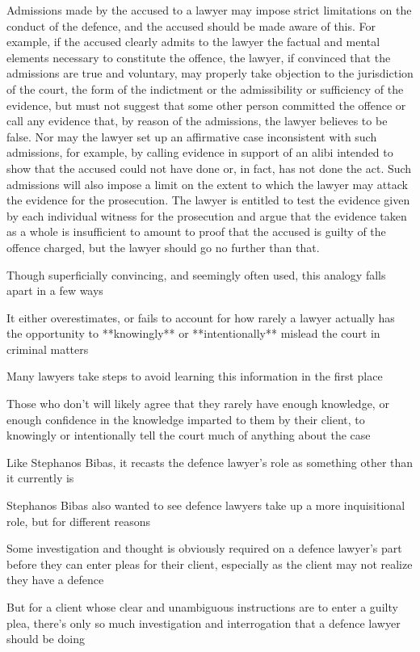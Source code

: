 Admissions made by the accused to a lawyer may impose strict limitations on the conduct of the defence, and the accused should be made aware of this. For example, if the accused clearly admits to the lawyer the factual and mental elements necessary to constitute the offence, the lawyer, if convinced that the admissions are true and voluntary, may properly take objection to the jurisdiction of the court, the form of the indictment or the admissibility or sufficiency of the evidence, but must not suggest that some other person committed the offence or call any evidence that, by reason of the admissions, the lawyer believes to be false. Nor may the lawyer set up an affirmative case inconsistent with such admissions, for example, by calling evidence in support of an alibi intended to show that the accused could not have done or, in fact, has not done the act. Such admissions will also impose a limit on the extent to which the lawyer may attack the evidence for the prosecution. The lawyer is entitled to test the evidence given by each individual witness for the prosecution and argue that the evidence taken as a whole is insufficient to amount to proof that the accused is guilty of the offence charged, but the lawyer should go no further than that.

Though superficially convincing, and seemingly often used, this analogy falls apart in a few ways

It either overestimates, or fails to account for how rarely a lawyer actually has the opportunity to **knowingly** or **intentionally** mislead the court in criminal matters

Many lawyers take steps to avoid learning this information in the first place

Those who don't will likely agree that they rarely have enough knowledge, or enough confidence in the knowledge imparted to them by their client, to knowingly or intentionally tell the court much of anything about the case

Like Stephanos Bibas, it recasts the defence lawyer's role as something other than it currently is

Stephanos Bibas also wanted to see defence lawyers take up a more inquisitional role, but for different reasons

Some investigation and thought is obviously required on a defence lawyer's part before they can enter pleas for their client, especially as the client may not realize they have a defence

But for a client whose clear and unambiguous instructions are to enter a guilty plea, there's only so much investigation and interrogation that a defence lawyer should be doing

